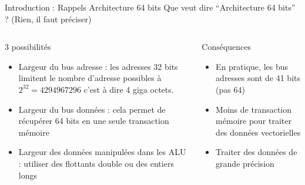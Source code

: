 \begin{Frame}{Introduction : Rappels Architecture 64 bits}
    Que veut dire ``Architecture 64 bits'' ? (Rien, il faut préciser)
 \begin{columns}[t]
  \begin{column}{\BW}

    \begin{block}{3 possibilités}
      \begin{itemize}
      \item Largeur du bus adresse : les adresses 32 bits limitent le
        nombre d'adresse possibles à $2^{32}= 4 294 967 296$ c'est à
        dire 4 giga octets.
        \item Largeur du bus données : cela permet de récupérer 64
          bits en une seule transaction mémoire
        \item Largeur des données manipulées dans les ALU : utiliser
          des flottants double ou des entiers longs
      \end{itemize}
    \end{block}
  \end{column}
  \begin{column}{\BW}
    \begin{block}{Conséquences}
      \begin{itemize}
      \item En pratique, les bus adresses sont de 41 bits (pas 64)
      \item Moins de transaction mémoire pour traiter des données
        vectorielles
      \item Traiter des données de grande précision
      \end{itemize}
    \end{block}
  \end{column}

 \end{columns}
\end{Frame}
